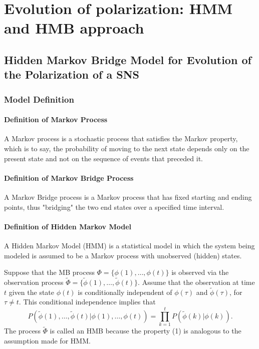 \documentclass[12pt]{report} %
\begin{document}


\chapter{Evolution of polarization: HMM and HMB approach}
\section{Hidden Markov Bridge Model for Evolution of the Polarization of a SNS}

\subsection{Model Definition}

\subsubsection{Definition of Markov Process}
A Markov process is a stochastic process that satisfies the Markov property, which is to say, the probability of moving to the next state depends only on the present state and not on the sequence of events that preceded it.

\subsubsection{Definition of Markov Bridge Process}
A Markov Bridge process is a Markov process that has fixed starting and ending points, thus "bridging" the two end states over a specified time interval.

\subsubsection{Definition of Hidden Markov Model}
A Hidden Markov Model (HMM) is a statistical model in which the system being modeled is assumed to be a Markov process with unobserved (hidden) states.

Suppose that the MB process $\Phi = \{\phi(1), \ldots, \phi(t)\}$ is observed via the observation process $\tilde{\Phi} = \{\tilde{\phi}(1), \ldots, \tilde{\phi}(t)\}$. Assume that the observation at time $t$ given the state $\phi(t)$ is conditionally independent of $\phi(\tau)$ and $\tilde{\phi}(\tau)$, for $\tau \neq t$. This conditional independence implies that
\begin{equation}
P(\tilde{\phi}(1), \ldots, \tilde{\phi}(t)|\phi(1), \ldots, \phi(t)) = \prod_{k=1}^{t} P(\tilde{\phi}(k)|\phi(k)).
\end{equation}
The process $\tilde{\Phi}$ is called an HMB because the property (1) is analogous to the assumption made for HMM.
\end{document}
